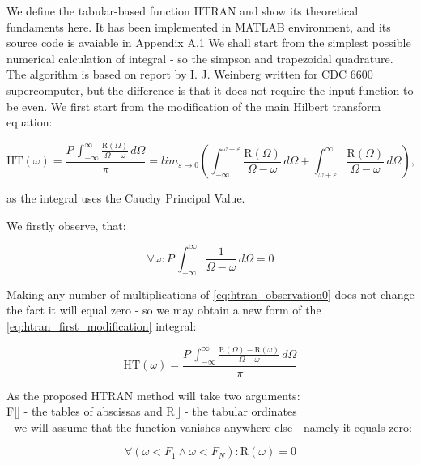 \documentclass[12pt,twoside,a4paper]{article}
\def\emptyline{\vspace{12pt}}
\numberwithin{equation}{subsection}
\numberwithin{figure}{subsection}
\begin{document}
We define the tabular-based function HTRAN and show its theoretical fundaments here. It has been implemented in MATLAB environment,
and its source code is avaiable in Appendix A.1 We shall start from the simplest possible numerical calculation of
integral - so the simpson and trapezoidal quadrature. The algorithm is based on report by I. J. Weinberg \cite{weinberg_hilbert} written for CDC
6600 supercomputer, but the difference is that it does not require the input function to be even. We first start from the
modification of the main Hilbert transform equation:

\begin{equation} \label{eq:htran_first_modification}
  \mathrm{HT}(\omega )=\frac {P\,\int_{ - \infty }^{\infty } \frac {\mathrm{R}(\Omega )}{\Omega  - \omega }\,d\Omega }{\pi } =
  {lim_{\varepsilon \rightarrow 0}} \left(  \! \int_{ - \infty }^{\omega  - \varepsilon }\frac {\mathrm{R}(\Omega )}{\Omega  -
  \omega }\,d\Omega  + \int_{\omega  + \varepsilon }^{\infty }\frac {\mathrm{R}(\Omega )}{\Omega  - \omega }\,d\Omega \!  \right),
\end{equation} 

as the integral uses the Cauchy Principal Value. 

\emptyline

We firstly observe, that:

\begin{equation} \label{eq:htran_observation0}
  \forall \omega : P\,\int_{ - \infty }^{\infty }\frac {1}{\Omega  - \omega }\,d\Omega =0
\end{equation}


Making any number of multiplications of \ref{eq:htran_observation0} does not change the fact it will equal zero - so we may obtain
a new form of the \ref{eq:htran_first_modification} integral:

\begin{equation} \label{eq:htran_newintegral}
  \mathrm{HT}(\omega )=\frac {P\,\int_{ - \infty }^{\infty }\frac {\mathrm{R}(\Omega ) - \mathrm{R}(\omega )}{\Omega - \omega
  }\,d\Omega }{\pi }
\end{equation}


As the proposed HTRAN method will take two arguments: \\
F[] - the tables of abscissas and R[] - the tabular ordinates \\
- we will assume that the function vanishes anywhere else - namely it equals zero:

\begin{equation} \label{eq:htran_vanishes}
  \forall ( \omega < F_{1} \wedge \omega < F_{N} ) : \mathrm{R}(\omega )=0  
\end{equation}
\end{document}
